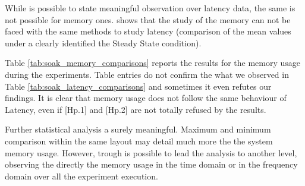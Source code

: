 While is possible to state meaningful observation over latency data, the same is not possible for memory ones. \name shows that the study of the memory can not be faced with the same methods to study latency (comparison of the mean values under a clearly identified the Steady State condition). 

Table \ref{tab:soak_memory_comparisons} reports the results for the memory usage during the experiments. Table entries do not confirm the what we observed in Table \ref{tab:soak_latency_comparisons} and sometimes it even refutes our findings. It is clear that memory usage does not follow the same behaviour of Latency, even if [Hp.1] and [Hp.2] are not totally refused by the results.

Further statistical analysis a surely meaningful. Maximum and minimum comparison within the same layout may detail much more the the system memory usage. However, trough \name is possible to lead the analysis to another level, observing the directly the memory usage in the time domain or in the frequency domain over all the experiment execution. 



